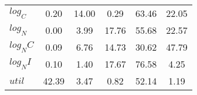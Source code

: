 \begin{center}
\begin{longtable}{lccccc}
$log_C         $	 & 	        0.20	 & 	       14.00	 & 	        0.29	 & 	       63.46	 & 	       22.05 \\ 
$log_N         $	 & 	        0.00	 & 	        3.99	 & 	       17.76	 & 	       55.68	 & 	       22.57 \\ 
$log_NC        $	 & 	        0.09	 & 	        6.76	 & 	       14.73	 & 	       30.62	 & 	       47.79 \\ 
$log_NI        $	 & 	        0.10	 & 	        1.40	 & 	       17.67	 & 	       76.58	 & 	        4.25 \\ 
$util          $	 & 	       42.39	 & 	        3.47	 & 	        0.82	 & 	       52.14	 & 	        1.19 \\ 
\end{longtable}
 \end{center}
